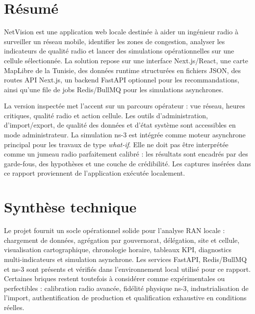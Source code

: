 \documentclass[12pt,a4paper,oneside]{report}
\begin{document}
\chapter*{Résumé}
NetVision est une application web locale destinée à aider un ingénieur radio à surveiller un réseau mobile, identifier les zones de congestion, analyser les indicateurs de qualité radio et lancer des simulations opérationnelles sur une cellule sélectionnée. La solution repose sur une interface Next.js/React, une carte MapLibre de la Tunisie, des données runtime structurées en fichiers JSON, des routes API Next.js, un backend FastAPI optionnel pour les recommandations, ainsi qu'une file de jobs Redis/BullMQ pour les simulations asynchrones.

La version inspectée met l'accent sur un parcours opérateur : vue réseau, heures critiques, qualité radio et action cellule. Les outils d'administration, d'import/export, de qualité des données et d'état système sont accessibles en mode administrateur. La simulation ns-3 est intégrée comme moteur asynchrone principal pour les travaux de type \emph{what-if}. Elle ne doit pas être interprétée comme un jumeau radio parfaitement calibré : les résultats sont encadrés par des garde-fous, des hypothèses et une couche de crédibilité. Les captures insérées dans ce rapport proviennent de l'application exécutée localement.

\chapter*{Synthèse technique}
Le projet fournit un socle opérationnel solide pour l'analyse RAN locale : chargement de données, agrégation par gouvernorat, délégation, site et cellule, visualisation cartographique, chronologie horaire, tableaux KPI, diagnostics multi-indicateurs et simulation asynchrone. Les services FastAPI, Redis/BullMQ et ns-3 sont présents et vérifiés dans l'environnement local utilisé pour ce rapport. Certaines briques restent toutefois à considérer comme expérimentales ou perfectibles : calibration radio avancée, fidélité physique ns-3, industrialisation de l'import, authentification de production et qualification exhaustive en conditions réelles.
\end{document}
